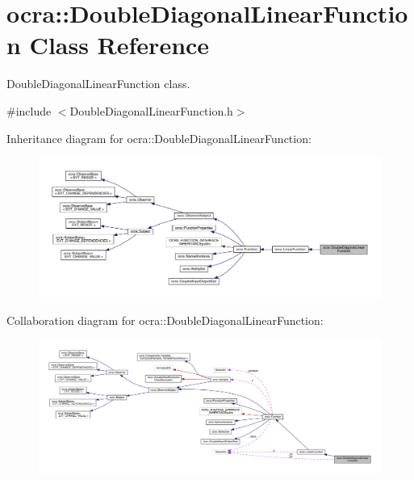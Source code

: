 \hypertarget{classocra_1_1DoubleDiagonalLinearFunction}{}\section{ocra\+:\+:Double\+Diagonal\+Linear\+Function Class Reference}
\label{classocra_1_1DoubleDiagonalLinearFunction}


Double\+Diagonal\+Linear\+Function class.  




{\ttfamily \#include $<$Double\+Diagonal\+Linear\+Function.\+h$>$}



Inheritance diagram for ocra\+:\+:Double\+Diagonal\+Linear\+Function\+:\nopagebreak
\begin{figure}[H]
\begin{center}
\leavevmode
\includegraphics[width=350pt]{dd/d2b/classocra_1_1DoubleDiagonalLinearFunction__inherit__graph}
\end{center}
\end{figure}


Collaboration diagram for ocra\+:\+:Double\+Diagonal\+Linear\+Function\+:\nopagebreak
\begin{figure}[H]
\begin{center}
\leavevmode
\includegraphics[width=350pt]{d8/d92/classocra_1_1DoubleDiagonalLinearFunction__coll__graph}
\end{center}
\end{figure}

